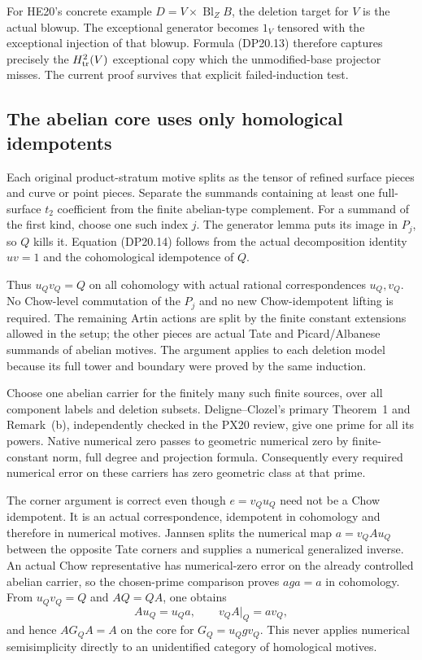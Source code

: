 For HE20's concrete example $D=V\times\operatorname{Bl}_Z B$,
the deletion target for $V$ is the actual blowup. The exceptional
generator becomes $1_V$ tensored with the exceptional injection
of that blowup. Formula (DP20.13) therefore captures precisely
the $H^2_{\rm tr}(V)$ exceptional copy which the unmodified-base
projector misses. The current proof survives that explicit
failed-induction test.

\subsection{The abelian core uses only homological idempotents}

Each original product-stratum motive splits as the tensor of
refined surface pieces and curve or point pieces. Separate the
summands containing at least one full-surface $t_2$ coefficient
from the finite abelian-type complement. For a summand of the
first kind, choose one such index $j$. The generator lemma puts
its image in $P_j$, so $Q$ kills it. Equation (DP20.14) follows
from the actual decomposition identity $uv=1$ and the
cohomological idempotence of $Q$.

Thus $u_Qv_Q=Q$ on all cohomology with actual rational
correspondences $u_Q,v_Q$. No Chow-level commutation of the
$P_j$ and no new Chow-idempotent lifting is required. The
remaining Artin actions are split by the finite constant
extensions allowed in the setup; the other pieces are actual
Tate and Picard/Albanese summands of abelian motives. The
argument applies to each deletion model because its full
tower and boundary were proved by the same induction.

Choose one abelian carrier for the finitely many such finite
sources, over all component labels and deletion subsets.
Deligne--Clozel's primary Theorem~1 and Remark~(b), independently
checked in the PX20 review, give one prime for all its powers.
Native numerical zero passes to geometric numerical zero by
finite-constant norm, full degree and projection formula.
Consequently every required numerical error on these carriers
has zero geometric class at that prime.

The corner argument is correct even though $e=v_Qu_Q$ need
not be a Chow idempotent. It is an actual correspondence,
idempotent in cohomology and therefore in numerical motives.
Jannsen splits the numerical map
$a=v_QAu_Q$ between the opposite Tate corners and supplies
a numerical generalized inverse. An actual Chow representative
has numerical-zero error on the already controlled abelian
carrier, so the chosen-prime comparison proves $aga=a$ in
cohomology. From $u_Qv_Q=Q$ and $AQ=QA$, one obtains
\[
 A u_Q=u_Qa,\qquad v_QA|_Q=a v_Q,
\]
and hence $AG_QA=A$ on the core for $G_Q=u_Qgv_Q$.
This never applies numerical semisimplicity directly to an
unidentified category of homological motives.

